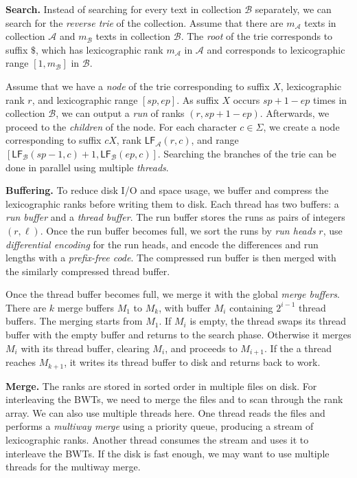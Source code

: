 \documentclass[smallabstract,smallcaptions]{dccpaper}
\newcommand{\BWT}{\textsf{BWT}}
\newcommand{\mLF}{\ensuremath{\mathsf{LF}}}
\newcommand{\Acoll}{\ensuremath{\mathcal{A}}}
\newcommand{\Bcoll}{\ensuremath{\mathcal{B}}}
\begin{document}
\smallbreak\noindent\textbf{Search.} Instead of searching for every text in collection $\Bcoll$ separately, we can search for the \emph{reverse trie} of the collection. Assume that there are $m_{\Acoll}$ texts in collection $\Acoll$ and $m_{\Bcoll}$ texts in collection $\Bcoll$. The \emph{root} of the trie corresponds to suffix $\$$, which has lexicographic rank $m_{\Acoll}$ in $\Acoll$ and corresponds to lexicographic range $[1,m_{\Bcoll}]$ in $\Bcoll$.

Assume that we have a \emph{node} of the trie corresponding to suffix $X$, lexicographic rank $r$, and lexicographic range $[sp,ep]$. As suffix $X$ occurs $sp+1-ep$ times in collection $\Bcoll$, we can output a \emph{run} of ranks $(r, sp+1-ep)$. Afterwards, we proceed to the \emph{children} of the node. For each character $c \in \Sigma$, we create a node corresponding to suffix $cX$, rank $\mLF_{\Acoll}(r,c)$, and range $[\mLF_{\Bcoll}(sp-1, c) + 1, \mLF_{\Bcoll}(ep, c)]$. Searching the branches of the trie can be done in parallel using multiple \emph{threads}.

\smallbreak\noindent\textbf{Buffering.} To reduce disk I/O and space usage, we buffer and compress the lexicographic ranks before writing them to disk. Each thread has two buffers: a \emph{run buffer} and a \emph{thread buffer}. The run buffer stores the runs as pairs of integers $(r, \ell)$. Once the run buffer becomes full, we sort the runs by \emph{run heads} $r$, use \emph{differential encoding} for the run heads, and encode the differences and run lengths with a \emph{prefix-free code}. The compressed run buffer is then merged with the similarly compressed thread buffer.

Once the thread buffer becomes full, we merge it with the global \emph{merge buffers}. There are $k$ merge buffers $M_{1}$ to $M_{k}$, with buffer $M_{i}$ containing $2^{i-1}$ thread buffers. The merging starts from $M_{1}$. If $M_{i}$ is empty, the thread swaps its thread buffer with the empty buffer and returns to the search phase. Otherwise it merges $M_{i}$ with its thread buffer, clearing $M_{i}$, and proceeds to $M_{i+1}$. If the a thread reaches $M_{k+1}$, it writes its thread buffer to disk and returns back to work.

\smallbreak\noindent\textbf{Merge.} The ranks are stored in sorted order in multiple files on disk. For interleaving the \BWT{}s, we need to merge the files and to scan through the rank array. We can also use multiple threads here. One thread reads the files and performs a \emph{multiway merge} using a priority queue, producing a stream of lexicographic ranks. Another thread consumes the stream and uses it to interleave the \BWT{}s. If the disk is fast enough, we may want to use multiple threads for the multiway merge.
\end{document}
